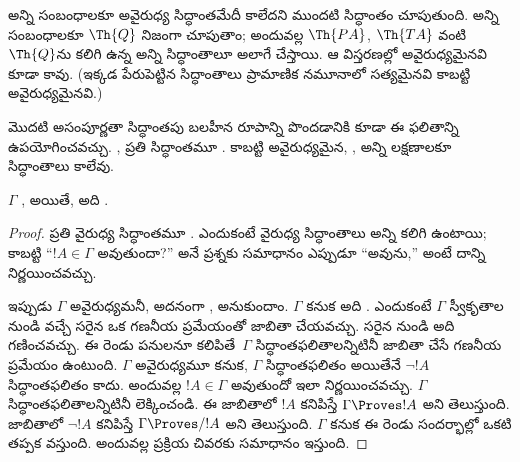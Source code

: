 \documentclass[../../../include/open-logic-section]{subfiles}
\begin{document}
\begin{explain}
అన్ని  సంబంధాలకూ
అవైరుధ్య సిద్ధాంతమేదీ  కాలేదని ముందటి
సిద్ధాంతం చూపుతుంది. అన్ని  సంబంధాలకూ
$\Th{Q}$ నిజంగా  చూపుతాం;
అందువల్ల $\Th{PA}$, $\Th{TA}$ వంటి $\Th{Q}$ను కలిగి ఉన్న అన్ని సిద్ధాంతాలూ
అలాగే చేస్తాయి. ఆ విస్తరణల్లో అవైరుధ్యమైనవి కూడా
 కావు.
(ఇక్కడ పేరుపెట్టిన సిద్ధాంతాలు ప్రామాణిక నమూనాలో సత్యమైనవి కాబట్టి
అవైరుధ్యమైనవి.)

మొదటి అసంపూర్ణతా సిద్ధాంతపు బలహీన రూపాన్ని పొందడానికి కూడా ఈ ఫలితాన్ని
ఉపయోగించవచ్చు. ,
 ప్రతి సిద్ధాంతమూ
. కాబట్టి అవైరుధ్యమైన,
, అన్ని
 లక్షణాలకూ
 సిద్ధాంతాలు
 కాలేవు.
\end{explain}

\begin{thm}
$\Gamma$ ,
 అయితే, అది
.
\end{thm}

\begin{proof}
ప్రతి వైరుధ్య సిద్ధాంతమూ . ఎందుకంటే
వైరుధ్య సిద్ధాంతాలు అన్ని  కలిగి ఉంటాయి;
కాబట్టి ``$!A\in\Gamma$ అవుతుందా?'' అనే ప్రశ్నకు సమాధానం ఎప్పుడూ ``అవును,''
అంటే దాన్ని నిర్ణయించవచ్చు.

ఇప్పుడు $\Gamma$ అవైరుధ్యమనీ, అదనంగా
,
 అనుకుందాం. $\Gamma$
 కనుక అది
. ఎందుకంటే
$\Gamma$ స్వీకృతాల నుండి వచ్చే సరైన 
ఒక గణనీయ ప్రమేయంతో జాబితా చేయవచ్చు. సరైన 
నుండి అది  
గణించవచ్చు. ఈ రెండు పనులనూ కలిపితే~$\Gamma$ సిద్ధాంతఫలితాలన్నిటినీ జాబితా చేసే
గణనీయ ప్రమేయం ఉంటుంది. $\Gamma$ అవైరుధ్యమూ
 కనుక, 
$\Gamma$ సిద్ధాంతఫలితం అయితేనే $\lnot !A$ సిద్ధాంతఫలితం కాదు. అందువల్ల
$!A\in\Gamma$ అవుతుందో ఇలా నిర్ణయించవచ్చు. $\Gamma$ సిద్ధాంతఫలితాలన్నిటినీ
లెక్కించండి. ఈ జాబితాలో $!A$ కనిపిస్తే $\Gamma\Proves !A$ అని తెలుస్తుంది.
జాబితాలో $\lnot !A$ కనిపిస్తే $\Gamma\Proves/ !A$ అని తెలుస్తుంది. $\Gamma$
 కనుక ఈ రెండు సందర్భాల్లో ఒకటి తప్పక వస్తుంది.
అందువల్ల ప్రక్రియ చివరకు సమాధానం ఇస్తుంది.
\end{proof}
\end{document}
